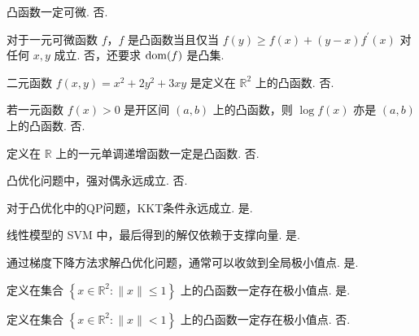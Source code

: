 \begin{problem}[判断]
    凸函数一定可微.
    \Answer 否.
\end{problem}

\begin{problem}[判断]
    对于一元可微函数 $f$，$f$ 是凸函数当且仅当 $f(y) \ge f(x) + (y - x)f^\prime(x)$ 对任何 $x, y$ 成立.
    \Answer 否，还要求 $\operatorname{dom}(f)$ 是凸集.
\end{problem}

\begin{problem}[判断]
    二元函数 $f(x, y) = x^2 + 2y^2 + 3xy$ 是定义在 $\mathbb{R}^2$ 上的凸函数.
    \Answer 否.
\end{problem}

\begin{problem}[判断]
    若一元函数 $f(x) > 0$ 是开区间 $(a, b)$ 上的凸函数，则 $\log f(x)$ 亦是 $(a, b)$ 上的凸函数.
    \Answer 否.
\end{problem}

\begin{problem}[判断]
    定义在 $\mathbb{R}$ 上的一元单调递增函数一定是凸函数.
    \Answer 否.
\end{problem}

\begin{problem}[判断]
    凸优化问题中，强对偶永远成立.
    \Answer 否.
\end{problem}

\begin{problem}[判断]
    对于凸优化中的QP问题，KKT条件永远成立.
    \Answer 是.
\end{problem}

\begin{problem}[判断]
    线性模型的 SVM 中，最后得到的解仅依赖于支撑向量.
    \Answer 是.
\end{problem}

\begin{problem}[判断]
    通过梯度下降方法求解凸优化问题，通常可以收敛到全局极小值点.
    \Answer 是.
\end{problem}

\begin{problem}[判断]
    定义在集合 $\left\{x \in \mathbb{R}^2: \|x\| \le 1\right\}$ 上的凸函数一定存在极小值点.
    \Answer 是.
\end{problem}

\begin{problem}[判断]
    定义在集合 $\left\{x \in \mathbb{R}^2: \|x\| < 1\right\}$ 上的凸函数一定存在极小值点.
    \Answer 否.
\end{problem}

